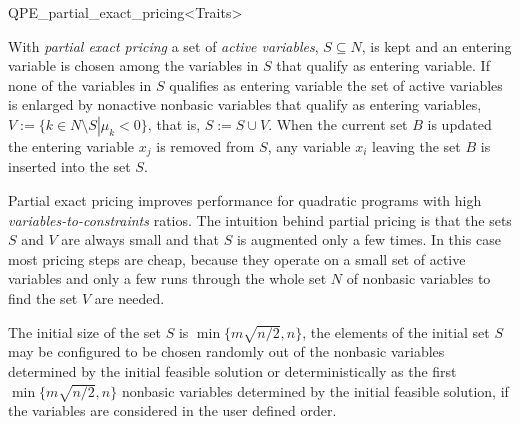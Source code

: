 
\begin{ccRefClass}{QPE_partial_exact_pricing<Traits>}

\ccDefinition

With \emph{partial exact pricing} a set of \emph{active variables},
$S \subseteq N$, is kept and an entering variable is chosen among the
variables in $S$ that qualify as entering variable. If none of the variables
in $S$ qualifies as entering variable the set of active variables is enlarged by
nonactive nonbasic variables that qualify as entering variables,
$V:=\{k \in N \setminus S \left|\right. \mu_{k} < 0\}$, that is,
$S:=S \cup V$. When the current set $B$
is updated the entering variable $x_{j}$ is removed from $S$, any variable
$x_{i}$ leaving the set $B$ is inserted into the set $S$.

Partial exact pricing improves performance for quadratic programs
with high \emph{variables-to-constraints} ratios.
The intuition behind partial pricing is that the sets $S$ and $V$ are always
small and that $S$ is augmented only a few times. In this case most pricing
steps are cheap, because they operate on a small set of active variables and
only a few runs through the whole set $N$ of nonbasic variables to find the set
$V$ are needed.

The initial size of the set $S$ is $\min\{m\sqrt{n/2}, n\}$, the elements of
the initial set $S$ may be configured to be chosen randomly out of the nonbasic
variables determined by the initial feasible solution or
deterministically as the first $\min\{m\sqrt{n/2}, n\}$ nonbasic
variables determined by the initial feasible solution, if the variables are
considered in the user defined order.   
   

\end{ccRefClass}
